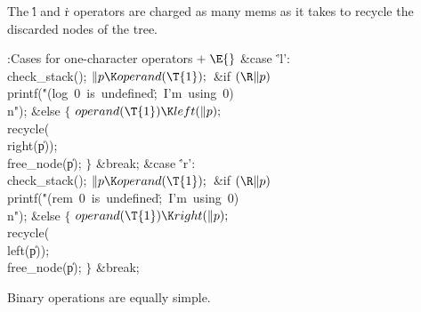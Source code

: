 The \.l and \.r operators are charged as many mems as it
takes to
recycle the discarded nodes of the tree.

\Y\B\4:Cases for one-character operators\X${}\mathrel+\E{}$\6
\4\&{case} \.{'l'}:\5
\\{check\_stack}();\6
${}\|p\K\\{operand}(\T{1});{}$\6
\&{if} ${}(\R\|p){}$\1\5
\\{printf}(\.{"(log\ 0\ is\ undefined}\)\.{;\ I'm\ using\ 0)\\n"});\2\6
\&{else}\5
${}\{{}$\1\6
${}\\{operand}(\T{1})\K\\{left}(\|p);{}$\6
\\{recycle}(\\{right}(\|p));\6
\\{free\_node}(\|p);\6
\4${}\}{}$\2\6
\&{break};\6
\4\&{case} \.{'r'}:\5
\\{check\_stack}();\6
${}\|p\K\\{operand}(\T{1});{}$\6
\&{if} ${}(\R\|p){}$\1\5
\\{printf}(\.{"(rem\ 0\ is\ undefined}\)\.{;\ I'm\ using\ 0)\\n"});\2\6
\&{else}\5
${}\{{}$\1\6
${}\\{operand}(\T{1})\K\\{right}(\|p);{}$\6
\\{recycle}(\\{left}(\|p));\6
\\{free\_node}(\|p);\6
\4${}\}{}$\2\6
\&{break};\par
\fi

Binary operations are equally simple.

